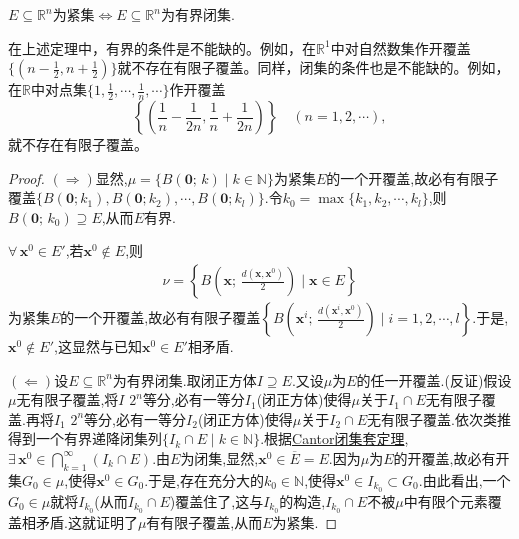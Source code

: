 \documentclass[../../main.tex]{subfiles}%
\begin{document}
\begin{theorem}\label{theorem:Heine - Borel有限子覆盖定理}
$E\subseteq\mathbb{R}^n$为紧集$\iff E\subseteq\mathbb{R}^n$为有界闭集.
\end{theorem}
\begin{remark}
在上述定理中，有界的条件是不能缺的。例如，在\(\mathbb{R}^1\)中对自然数集作开覆盖\(\{(n-\frac{1}{2},n+\frac{1}{2})\}\)就不存在有限子覆盖。同样，闭集的条件也是不能缺的。例如，在\(\mathbb{R}\)中对点集\(\{1,\frac{1}{2},\cdots,\frac{1}{n},\cdots\}\)作开覆盖
\[\left\{\left(\frac{1}{n}-\frac{1}{2n},\frac{1}{n}+\frac{1}{2n}\right)\right\}\quad(n = 1,2,\cdots),\]
就不存在有限子覆盖。
\end{remark}
\begin{proof}

$(\Rightarrow)$显然,$\mu=\{B(\mathbf{0};\,k)\mid k\in\mathbb{N}\}$为紧集$E$的一个开覆盖,故必有有限子覆盖$\{B(\mathbf{0};k_1),B(\mathbf{0};k_2),\cdots,B(\mathbf{0};k_l)\}$.令$k_0=\max\{k_1,k_2,\cdots,k_l\}$,则$B(\mathbf{0};\,k_0)\supseteq E$,从而$E$有界.

$\forall\,\mathbf{x}^0\in E'$,若$\mathbf{x}^0\notin E$,则
\begin{align*}
\nu=\left\{B\left(\mathbf{x};\,\frac{d(\mathbf{x},\mathbf{x}^0)}{2}\right)\mid \mathbf{x}\in E\right\}
\end{align*}
为紧集$E$的一个开覆盖,故必有有限子覆盖$\left\{B\left(\mathbf{x}^i;\,\frac{d(\mathbf{x}^i,\mathbf{x}^0)}{2}\right)\mid i=1,2,\cdots,l\right\}$.于是,$\mathbf{x}^0\notin E'$,这显然与已知$\mathbf{x}^0\in E'$相矛盾.

$(\Leftarrow)$设$E\subseteq\mathbb{R}^n$为有界闭集.取闭正方体$I\supseteq E$.又设$\mu$为$E$的任一开覆盖.(反证)假设$\mu$无有限子覆盖,将$I$ $2^n$等分,必有一等分$I_1$(闭正方体)使得$\mu$关于$I_1\cap E$无有限子覆盖.再将$I_1$ $2^n$等分,必有一等分$I_2$(闭正方体)使得$\mu$关于$I_2\cap E$无有限子覆盖.依次类推得到一个有界递降闭集列$\{I_k\cap E\mid k\in\mathbb{N}\}$.根据\hyperref[theorem:实变函数--Cantor闭集套定理]{Cantor闭集套定理},$\exists\,\mathbf{x}^0\in\bigcap\limits_{k=1}^{\infty}(I_k\cap E)$.由$E$为闭集,显然,$\mathbf{x}^0\in\overline{E}=E$.因为$\mu$为$E$的开覆盖,故必有开集$G_0\in\mu$,使得$\mathbf{x}^0\in G_0$.于是,存在充分大的$k_0\in\mathbb{N}$,使得$\mathbf{x}^0\in I_{k_0}\subset G_0$.由此看出,一个$G_0\in\mu$就将$I_{k_0}$(从而$I_{k_0}\cap E$)覆盖住了,这与$I_{k_0}$的构造,$I_{k_0}\cap E$不被$\mu$中有限个元素覆盖相矛盾.这就证明了$\mu$有有限子覆盖,从而$E$为紧集.

\end{proof}
\end{document}
